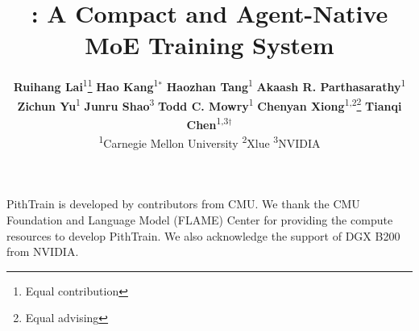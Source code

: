 \documentclass{article}
\title{\sys: A Compact and Agent-Native \\ MoE Training System}
\author{
  \textbf{Ruihang Lai}\textsuperscript{1}\thanks{Equal contribution} \quad
  \textbf{Hao Kang}\textsuperscript{1}$^*$ \quad
  \textbf{Haozhan Tang}\textsuperscript{1} \quad
  \textbf{Akaash R. Parthasarathy}\textsuperscript{1} \quad \\
  \textbf{Zichun Yu}\textsuperscript{1} \quad
  \textbf{Junru Shao}\textsuperscript{3} \quad
  \textbf{Todd C. Mowry}\textsuperscript{1} \quad
  \textbf{Chenyan Xiong}\textsuperscript{1,2}\thanks{Equal advising} \quad
  \textbf{Tianqi Chen}\textsuperscript{1,3}$^\dagger$ \quad \\
  \textsuperscript{1}Carnegie Mellon University \quad
  \textsuperscript{2}Xlue \quad
  \textsuperscript{3}NVIDIA \quad
}
\newcommand{\sys}{PithTrain\xspace}
\begin{document}


\maketitle









\begin{ack}
\sys is developed by contributors from CMU. We thank the CMU Foundation and
Language Model (FLAME) Center for providing the compute resources to develop
\sys. We also acknowledge the support of DGX B200 from NVIDIA.
\end{ack}







\end{document}
